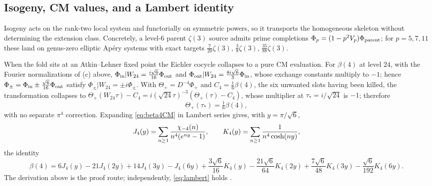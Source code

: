 \subsection{Isogeny, CM values, and a Lambert identity}\label{sec:cm}

Isogeny acts on the rank-two local system and functorially on symmetric
powers, so it transports the homogeneous skeleton without determining the
extension class.  Concretely, a level-$6$ parent $\zeta(3)$ source admits prime
completions $\Phi_p=(1-p^2V_p)\Phi_{\rm parent}$; for $p=5,7,11$ these land on
genus-zero elliptic Ap\'ery systems with exact targets
$\tfrac7{20}\zeta(3)$, $\tfrac38\zeta(3)$, $\tfrac{35}{88}\zeta(3)$.

When the fold sits at an Atkin--Lehner fixed point the Eichler cocycle
collapses to a pure CM evaluation.  For $\beta(4)$ at level $24$, with the
Fourier normalizations of (c) above,
$\Phi_{\rm in}|W_{24}=\tfrac{i\sqrt6}{16}\Phi_{\rm out}$ and
$\Phi_{\rm out}|W_{24}=\tfrac{8i\sqrt6}{3}\Phi_{\rm in}$, whose exchange
constants multiply to $-1$; hence
$\Phi_\pm=\Phi_{\rm in}\pm\tfrac{\sqrt6}{16}\Phi_{\rm out}$ satisfy
$\Phi_\pm|W_{24}=\pm i\Phi_\pm$.  With $\Theta_+=D^{-4}\Phi_+$ and
$C_4=\tfrac16\beta(4)$, the six unwanted slots having been killed, the
transformation collapses to
$\Theta_+(W_{24}\tau)-C_4=i(\sqrt{24}\tau)^{-3}(\Theta_+(\tau)-C_4)$, whose
multiplier at $\tau_*=i/\sqrt{24}$ is $-1$; therefore
\begin{equation}\label{eq:beta4CM}
\Theta_+(\tau_*)=\tfrac16\beta(4),
\end{equation}
with no separate $\pi^4$ correction.  Expanding \eqref{eq:beta4CM} in Lambert
series gives, with $y=\pi/\sqrt6$,
\[
J_4(y)=\sum_{n\ge1}\frac{\chi_{-4}(n)}{n^4(e^{ny}-1)},\qquad
K_4(y)=\sum_{n\ge1}\frac1{n^4\cosh(ny)},
\]
the identity
\begin{equation}\label{eq:lambert}
\beta(4)=6J_4(y)-21J_4(2y)+14J_4(3y)-J_4(6y)
+\frac{3\sqrt6}{16}K_4(y)-\frac{21\sqrt6}{64}K_4(2y)
+\frac{7\sqrt6}{48}K_4(3y)-\frac{\sqrt6}{192}K_4(6y).
\end{equation}
The derivation above is the proof route; independently,
\eqref{eq:lambert} holds .

